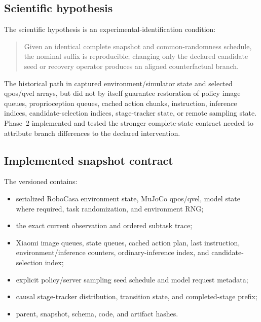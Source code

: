 
\subsection{Scientific hypothesis}

The scientific hypothesis is an experimental-identification condition:
\begin{quote}
Given an identical complete snapshot and common-randomness schedule, the nominal suffix is reproducible; changing only the declared candidate seed or recovery operator produces an aligned counterfactual branch.
\end{quote}

The historical  path in  captured environment/simulator state and selected qpos/qvel arrays, but did not by itself guarantee restoration of policy image queues, proprioception queues, cached action chunks, instruction, inference indices, candidate-selection indices, stage-tracker state, or remote sampling state. Phase~2 implemented and tested the stronger complete-state contract needed to attribute branch differences to the declared intervention.

\subsection{Implemented snapshot contract}

The versioned  contains:
\begin{itemize}
  \item serialized RoboCasa environment state, MuJoCo qpos/qvel, model state where required, task randomization, and environment RNG;
  \item the exact current observation and ordered subtask trace;
  \item Xiaomi image queues, state queues, cached action plan, last instruction, environment/inference counters, ordinary-inference index, and candidate-selection index;
  \item explicit policy/server sampling seed schedule and model request metadata;
  \item causal stage-tracker distribution, transition state, and completed-stage prefix;
  \item parent, snapshot, schema, code, and artifact hashes.
\end{itemize}

